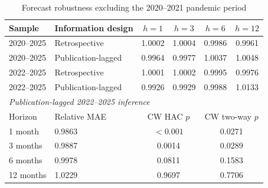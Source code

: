 \begin{table}[htbp]
\centering
\caption{Forecast robustness excluding the 2020--2021 pandemic period}
\label{tab:excovid}
\begin{tabular}{llcccc}
\toprule
Sample & Information design & $h=1$ & $h=3$ & $h=6$ & $h=12$ \\
\midrule
2020--2025 & Retrospective & 1.0002 & 1.0004 & 0.9986 & 0.9961 \\
2020--2025 & Publication-lagged & 0.9964 & 0.9977 & 1.0037 & 1.0048 \\
2022--2025 & Retrospective & 1.0001 & 1.0002 & 0.9995 & 0.9976 \\
2022--2025 & Publication-lagged & 0.9926 & 0.9929 & 0.9988 & 1.0133 \\
\midrule
\multicolumn{6}{l}{\textit{Publication-lagged 2022--2025 inference}} \\
Horizon & Relative MAE & \multicolumn{2}{c}{CW HAC $p$} & \multicolumn{2}{c}{CW two-way $p$} \\
\midrule
1 month & 0.9863 & \multicolumn{2}{c}{$<0.001$} & \multicolumn{2}{c}{0.0271} \\
3 months & 0.9887 & \multicolumn{2}{c}{0.0014} & \multicolumn{2}{c}{0.0289} \\
6 months & 0.9978 & \multicolumn{2}{c}{0.0811} & \multicolumn{2}{c}{0.1583} \\
12 months & 1.0229 & \multicolumn{2}{c}{0.9697} & \multicolumn{2}{c}{0.7706} \\
\bottomrule
\end{tabular}

\end{table}
